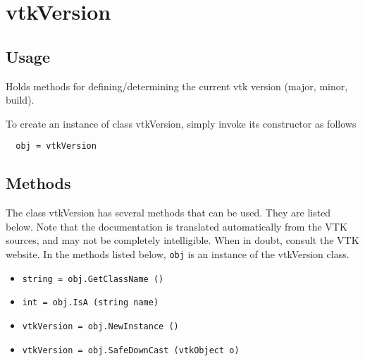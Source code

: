 \section{vtkVersion}

\subsection{Usage}

 Holds methods for defining/determining the current vtk version
 (major, minor, build).

To create an instance of class vtkVersion, simply
invoke its constructor as follows
\begin{verbatim}
  obj = vtkVersion
\end{verbatim}
\subsection{Methods}

The class vtkVersion has several methods that can be used.
  They are listed below.
Note that the documentation is translated automatically from the VTK sources,
and may not be completely intelligible.  When in doubt, consult the VTK website.
In the methods listed below, \verb|obj| is an instance of the vtkVersion class.
\begin{itemize}
\item  \verb|string = obj.GetClassName ()|

\item  \verb|int = obj.IsA (string name)|

\item  \verb|vtkVersion = obj.NewInstance ()|

\item  \verb|vtkVersion = obj.SafeDownCast (vtkObject o)|

\end{itemize}
